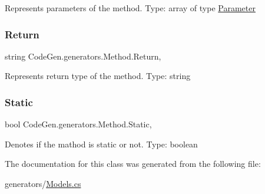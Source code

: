 Represents parameters of the method. Type\+: array of type \mbox{\hyperlink{classCodeGen_1_1generators_1_1Parameter}{Parameter}} 

\mbox{\label{classCodeGen_1_1generators_1_1Method_a1f14ec7aef5e61d595870f2fee56a885}} 
\subsubsection{\texorpdfstring{Return}{Return}}
{\footnotesize\ttfamily string Code\+Gen.\+generators.\+Method.\+Return\hspace{0.3cm}{\ttfamily [get]}, {\ttfamily [set]}}



Represents return type of the method. Type\+: string 

\mbox{\label{classCodeGen_1_1generators_1_1Method_a40aa2b9a7000ae6acc851b97410ce2af}} 
\subsubsection{\texorpdfstring{Static}{Static}}
{\footnotesize\ttfamily bool Code\+Gen.\+generators.\+Method.\+Static\hspace{0.3cm}{\ttfamily [get]}, {\ttfamily [set]}}



Denotes if the mathod is static or not. Type\+: boolean 



The documentation for this class was generated from the following file\+:\begin{DoxyCompactItemize}
\item 
generators/\mbox{\hyperlink{Models_8cs}{Models.\+cs}}\end{DoxyCompactItemize}
